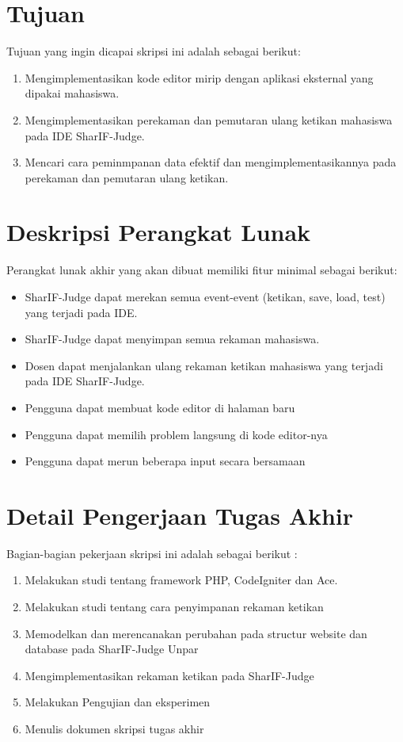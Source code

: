 \documentclass[a4paper,twoside]{article}
\begin{document}
\section{Tujuan}
Tujuan yang ingin dicapai skripsi ini adalah sebagai berikut:
    \begin{enumerate}
        \item Mengimplementasikan kode editor mirip dengan aplikasi eksternal yang dipakai mahasiswa.
        \item Mengimplementasikan perekaman dan pemutaran ulang ketikan mahasiswa pada IDE SharIF-Judge.
        \item Mencari cara peminmpanan data efektif dan mengimplementasikannya pada perekaman dan pemutaran ulang ketikan. 
    \end{enumerate}
\section{Deskripsi Perangkat Lunak}

Perangkat lunak akhir yang akan dibuat memiliki fitur minimal sebagai berikut:
\begin{itemize}
	\item SharIF-Judge dapat merekan semua event-event (ketikan, save, load, test) yang terjadi pada IDE.
    \item SharIF-Judge dapat menyimpan semua rekaman mahasiswa.
    \item Dosen dapat menjalankan ulang rekaman ketikan mahasiswa yang terjadi pada IDE SharIF-Judge.

    \item Pengguna dapat membuat kode editor di halaman baru
    \item Pengguna dapat memilih problem langsung di kode editor-nya
    \item Pengguna dapat merun beberapa input secara bersamaan
		
\end{itemize}

\section{Detail Pengerjaan Tugas Akhir}

Bagian-bagian pekerjaan skripsi ini adalah sebagai berikut :
	\begin{enumerate}

        \item Melakukan studi tentang framework PHP, CodeIgniter dan Ace.
        \item Melakukan studi tentang cara penyimpanan rekaman ketikan
        \item Memodelkan dan merencanakan perubahan pada structur website dan database pada SharIF-Judge Unpar
        \item Mengimplementasikan rekaman ketikan pada SharIF-Judge
        \item Melakukan Pengujian dan eksperimen
        \item Menulis dokumen skripsi tugas akhir
 
	\end{enumerate}
\end{document}
